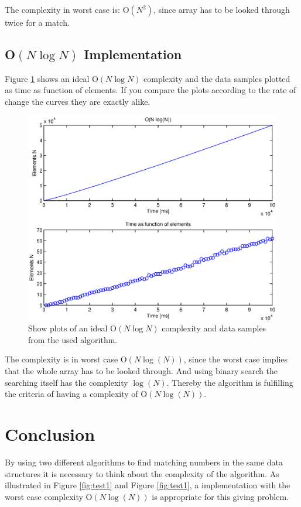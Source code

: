 The complexity in worst case is: O\(\left( { N }^{ 2 } \right)\), since array has to be looked through twice for a match. 


\newpage
\subsection{O\(\left( N\log {N }  \right) \) Implementation}
Figure \ref{fig:test2} shows an ideal O\(\left( N\log {N }  \right) \) complexity and the data samples plotted as time as function of elements. If you compare the plots according to the rate of change the curves they are exactly alike. 
\begin{figure}[th!]
\centering
\includegraphics[width=1\textwidth]{./graphics/test2.eps}
\caption{Show plots of an ideal O\(\left( N\log {N }  \right) \) complexity and data samples from the used algorithm.}
\label{fig:test2}
\end{figure}

The complexity is in worst case O\(\left( N\log {(N)}  \right) \), since the worst case implies that the whole array has to be looked through. And using binary search the searching itself has the complexity \( \log {(N)} \). Thereby the algorithm is fulfilling the criteria of having a complexity of O\(\left( N\log {(N)}  \right) \).  


\section{Conclusion}
By using two different algorithms to find matching numbers in the same data structures it is necessary to think about the complexity of the algorithm. As illustrated in Figure \ref{fig:test1} and Figure \ref{fig:test1}, a implementation with the worst case complexity O\(\left( N\log {(N)}  \right) \) is appropriate for this giving problem.
